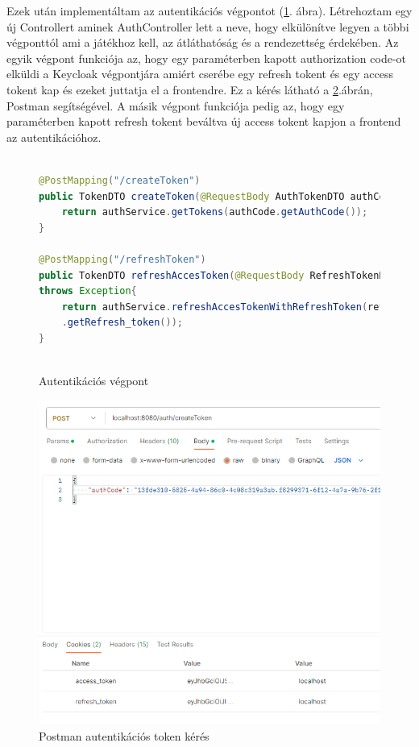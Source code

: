 \documentclass[a4paper,twoside]{article}
\begin{document}
Ezek után implementáltam az autentikációs végpontot (\ref{authEndpoint}. ábra). Létrehoztam egy új Controllert aminek AuthController lett a neve,
hogy elkülönítve legyen a többi végponttól ami a játékhoz kell, az átláthatóság és a rendezettség érdekében. Az egyik végpont 
funkciója az, hogy egy paraméterben kapott authorization code-ot elküldi a Keycloak végpontjára amiért cserébe egy refresh tokent és egy access tokent kap és ezeket juttatja el a frontendre. Ez a kérés látható a \ref{fig:postman}.ábrán, Postman segítségével.
A másik végpont funkciója pedig az, hogy egy paraméterben kapott refresh tokent beváltva új access tokent kapjon a frontend az autentikációhoz. 

\begin{figure}
	\caption{Autentikációs végpont}
	\centering
	\begin{lstlisting}[language=java,breaklines=true]
		
@PostMapping("/createToken")
public TokenDTO createToken(@RequestBody AuthTokenDTO authCode) throws Exception{
	return authService.getTokens(authCode.getAuthCode());
}		

@PostMapping("/refreshToken")
public TokenDTO refreshAccesToken(@RequestBody RefreshTokenDTO refreshTokenDTO)
throws Exception{
	return authService.refreshAccesTokenWithRefreshToken(refreshTokenDTO
	.getRefresh_token());
}
		
	\end{lstlisting}
	\label{authEndpoint}
\end{figure} 

\begin{figure}
	\caption{Postman autentikációs token kérés}
	\label{fig:postman}
	\centering
	\includegraphics[scale=0.5]{getTokens}
\end{figure}
\end{document}
